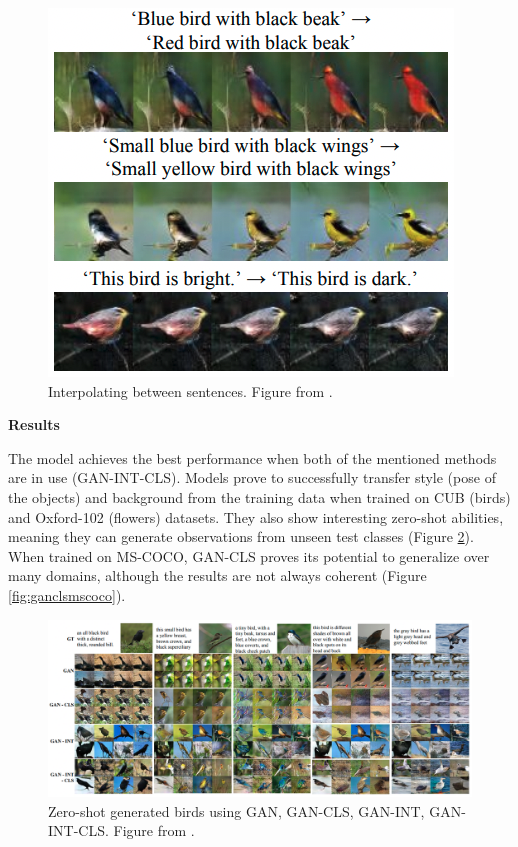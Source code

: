 \documentclass[
]{krantz}
\begin{document}
\begin{figure}

{\centering \includegraphics[width=0.6\linewidth]{figures/02-02-text-2-img/interpolatingbirds} 

}

\caption{Interpolating between sentences. Figure from \citet{GANTextToImage2016}.}\label{fig:interpolatingbirds}
\end{figure}



\textbf{Results}

The model achieves the best performance when both of the mentioned methods are in use (GAN-INT-CLS). Models prove to successfully transfer style (pose of the objects) and background from the training data when trained on CUB (birds) and Oxford-102 (flowers) datasets. They also show interesting zero-shot abilities, meaning they can generate observations from unseen test classes (Figure \ref{fig:ganclszeroshot}). When trained on MS-COCO, GAN-CLS proves its potential to generalize over many domains, although the results are not always coherent (Figure \ref{fig:ganclsmscoco}).

\begin{figure}

{\centering \includegraphics[width=1\linewidth]{figures/02-02-text-2-img/ganclszeroshot} 

}

\caption{Zero-shot generated birds using GAN, GAN-CLS, GAN-INT, GAN-INT-CLS. Figure from \citet{GANTextToImage2016}.}\label{fig:ganclszeroshot}
\end{figure}
\end{document}
